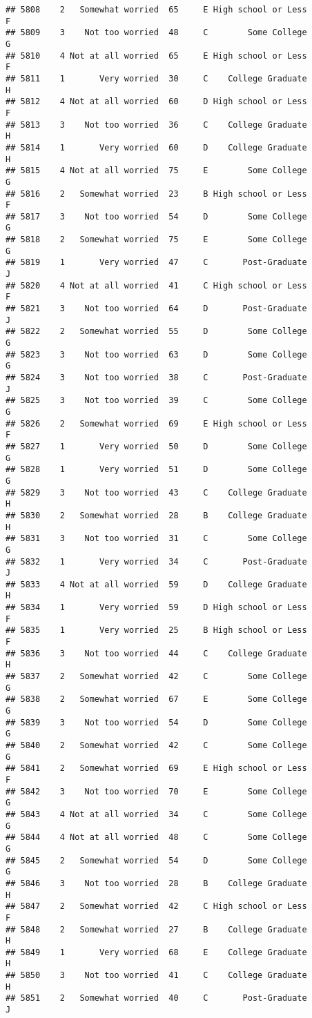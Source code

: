 \documentclass[
]{article}
\begin{document}
\begin{verbatim}
## 5808    2   Somewhat worried  65     E High school or Less         F
## 5809    3    Not too worried  48     C        Some College         G
## 5810    4 Not at all worried  65     E High school or Less         F
## 5811    1       Very worried  30     C    College Graduate         H
## 5812    4 Not at all worried  60     D High school or Less         F
## 5813    3    Not too worried  36     C    College Graduate         H
## 5814    1       Very worried  60     D    College Graduate         H
## 5815    4 Not at all worried  75     E        Some College         G
## 5816    2   Somewhat worried  23     B High school or Less         F
## 5817    3    Not too worried  54     D        Some College         G
## 5818    2   Somewhat worried  75     E        Some College         G
## 5819    1       Very worried  47     C       Post-Graduate         J
## 5820    4 Not at all worried  41     C High school or Less         F
## 5821    3    Not too worried  64     D       Post-Graduate         J
## 5822    2   Somewhat worried  55     D        Some College         G
## 5823    3    Not too worried  63     D        Some College         G
## 5824    3    Not too worried  38     C       Post-Graduate         J
## 5825    3    Not too worried  39     C        Some College         G
## 5826    2   Somewhat worried  69     E High school or Less         F
## 5827    1       Very worried  50     D        Some College         G
## 5828    1       Very worried  51     D        Some College         G
## 5829    3    Not too worried  43     C    College Graduate         H
## 5830    2   Somewhat worried  28     B    College Graduate         H
## 5831    3    Not too worried  31     C        Some College         G
## 5832    1       Very worried  34     C       Post-Graduate         J
## 5833    4 Not at all worried  59     D    College Graduate         H
## 5834    1       Very worried  59     D High school or Less         F
## 5835    1       Very worried  25     B High school or Less         F
## 5836    3    Not too worried  44     C    College Graduate         H
## 5837    2   Somewhat worried  42     C        Some College         G
## 5838    2   Somewhat worried  67     E        Some College         G
## 5839    3    Not too worried  54     D        Some College         G
## 5840    2   Somewhat worried  42     C        Some College         G
## 5841    2   Somewhat worried  69     E High school or Less         F
## 5842    3    Not too worried  70     E        Some College         G
## 5843    4 Not at all worried  34     C        Some College         G
## 5844    4 Not at all worried  48     C        Some College         G
## 5845    2   Somewhat worried  54     D        Some College         G
## 5846    3    Not too worried  28     B    College Graduate         H
## 5847    2   Somewhat worried  42     C High school or Less         F
## 5848    2   Somewhat worried  27     B    College Graduate         H
## 5849    1       Very worried  68     E    College Graduate         H
## 5850    3    Not too worried  41     C    College Graduate         H
## 5851    2   Somewhat worried  40     C       Post-Graduate         J
\end{verbatim}
\end{document}
